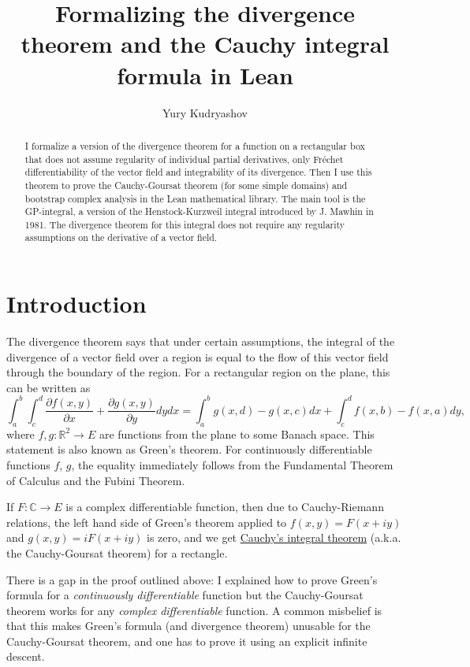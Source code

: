 \documentclass[a4paper,UKenglish,cleveref, autoref, thm-restate]{lipics-v2021}
\author{Yury Kudryashov}{University of Toronto at Mississauga, Canada}{yury.kudriashov@utoronto.ca}{https://orcid.org/0000-0003-4286-9276}{}
\title{Formalizing the divergence theorem and the Cauchy integral formula in Lean}
\newcommand{\bbR}{\mathbb{R}}
\newcommand{\bbC}{\mathbb{C}}
\begin{document}
\sloppy
\maketitle

\begin{abstract}
  I formalize a version of the divergence theorem for a function on a
  rectangular box that does not assume regularity of individual
  partial derivatives, only Fréchet differentiability of the vector
  field and integrability of its divergence. Then I use this theorem
  to prove the Cauchy-Goursat theorem (for some simple domains) and
  bootstrap complex analysis in the Lean mathematical library. The
  main tool is the GP-integral, a version of the Henstock-Kurzweil
  integral introduced by J. Mawhin in 1981. The divergence theorem for
  this integral does not require any regularity assumptions on the
  derivative of a vector field.
\end{abstract}

\section{Introduction}\label{sec:introduction}
The divergence theorem says that under certain assumptions, the
integral of the divergence of a vector field over a region is equal to
the flow of this vector field through the boundary of the region. For
a rectangular region on the plane, this can be written as
\begin{equation}
  \label{eqn:green-rect}
  \int_{a}^{b}\int_{c}^{d}\frac{\partial f(x, y)}{\partial x}+\frac{\partial g(x, y)}{\partial y}dydx=
  \int_{a}^{b}g(x, d)-g(x, c)dx+\int_{c}^{d}f(x, b)-f(x, a)dy,
\end{equation}
where \(f, g\colon \bbR^{2}\to E\) are functions from the plane to
some Banach space. This statement is also known as Green's theorem.
For continuously differentiable functions \(f\), \(g\), the equality
immediately follows from the Fundamental Theorem of Calculus and the
Fubini Theorem.

If \(F\colon \bbC\to E\) is a complex differentiable function, then due
to Cauchy-Riemann relations, the left hand side of Green's theorem
applied to \(f(x, y)=F(x+iy)\) and \(g(x, y)=iF(x+iy)\) is zero, and
we get
\href{https://en.wikipedia.org/wiki/Cauchy's_integral_theorem}{Cauchy's
  integral theorem} (a.k.a. the Cauchy-Goursat theorem) for a rectangle.

There is a gap in the proof outlined above: I explained how to prove
Green's formula for a \emph{continuously differentiable} function
but the Cauchy-Goursat theorem works for any \emph{complex
  differentiable} function. A common misbelief is that this makes
Green's formula (and divergence theorem) unusable for the Cauchy-Goursat
theorem, and one has to prove it using an explicit infinite descent.
\end{document}
